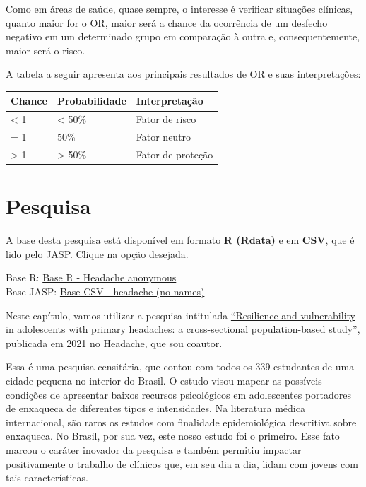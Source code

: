\documentclass[
]{book}
\newenvironment{base}{
  \definecolor{shadecolor}{rgb}{0.972,0.972,0.972}  %
  \color{black}
  \begin{shaded}}
 {\end{shaded}}
\begin{document}
Como em áreas de saúde, quase sempre, o interesse é verificar situações clínicas, quanto maior for o OR, maior será a chance da ocorrência de um desfecho negativo em um determinado grupo em comparação à outra e, consequentemente, maior será o risco.

A tabela a seguir apresenta aos principais resultados de OR e suas interpretações:

\begin{longtable}[]{@{}lll@{}}
\toprule
Chance & Probabilidade & Interpretação \\
\midrule
\endhead
\textless{} 1 & \textless{} 50\% & Fator de risco \\
= 1 & 50\% & Fator neutro \\
\textgreater{} 1 & \textgreater{} 50\% & Fator de proteção \\
\bottomrule
\end{longtable}

\hypertarget{pesquisa-11}{%
\section{Pesquisa}\label{pesquisa-11}}

\begin{base}
A base desta pesquisa está disponível em formato \textbf{R (Rdata)} e em \textbf{CSV}, que é lido pelo JASP. Clique na opção desejada.

Base R: \href{https://github.com/anovabr/mqt/raw/master/bases/Base\%20R\%20-\%20Headache\%20anonymous.RData}{Base R - Headache anonymous}\\
Base JASP: \href{https://github.com/anovabr/mqt/raw/master/bases/bases_csv_jasp.zip}{Base CSV - headache (no names)}

\end{base}

Neste capítulo, vamos utilizar a pesquisa intitulada \href{www.google.com}{``Resilience and vulnerability in adolescents with primary headaches: a cross-sectional population-based study''}, publicada em 2021 no Headache, que sou coautor.

Essa é uma pesquisa censitária, que contou com todos os 339 estudantes de uma cidade pequena no interior do Brasil. O estudo visou mapear as possíveis condições de apresentar baixos recursos psicológicos em adolescentes portadores de enxaqueca de diferentes tipos e intensidades. Na literatura médica internacional, são raros os estudos com finalidade epidemiológica descritiva sobre enxaqueca. No Brasil, por sua vez, este nosso estudo foi o primeiro. Esse fato marcou o caráter inovador da pesquisa e também permitiu impactar positivamente o trabalho de clínicos que, em seu dia a dia, lidam com jovens com tais características.
\end{document}
